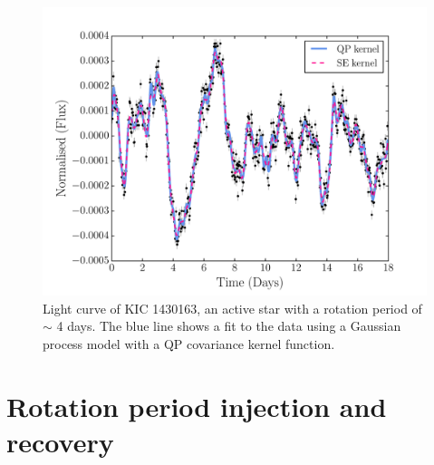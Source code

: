 \documentclass[useAMS, usenatbib, preprint, 12pt]{aastex}
\begin{document}
\begin{figure}
\begin{center}
\includegraphics[width=6in, clip=true]{figures/001430163.pdf}
\caption[A light curve with a GP model.]
{Light curve of KIC 1430163, an active star with a rotation period of $\sim$ 4
days.
The blue line shows a fit to the data using
a Gaussian process model with a QP covariance kernel function.}
\label{fig:GP_example}
\end{center}
\end{figure}

\section{Rotation period injection and recovery}
\end{document}
